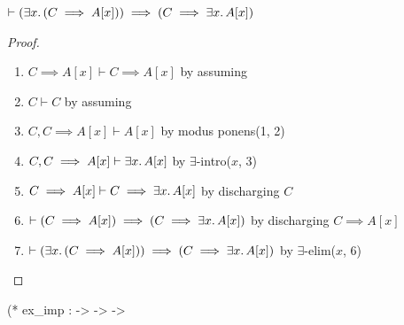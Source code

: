 \begin{node}
$\vdash(\exists x\ldotp(C\implies A[x]))\implies(C\implies\exists x\ldotp A[x])$
\end{node}

\begin{proof}
\begin{enumerate}
\item $C\implies A[x]\vdash C\implies A[x]$ by assuming
\item $C\vdash C$ by assuming
\item $C, C\implies A[x]\vdash A[x]$ by modus ponens(1, 2)%
\item $C, C\implies A[x]\vdash\exists x\ldotp A[x]$ by
  $\exists$-intro($x$, 3)%
\item $C\implies A[x]\vdash C\implies\exists x\ldotp A[x]$ by
  discharging $C$%
\item $\vdash(C\implies A[x])\implies(C\implies\exists x\ldotp A[x])$ by
  discharging $C\implies A[x]$%
\item $\vdash(\exists x\ldotp(C\implies A[x]))\implies(C\implies\exists x\ldotp A[x])$ by
  $\exists$-elim($x$, 6)\qedhere%
\end{enumerate}
\end{proof}

\nwenddocs{}\plusendmoddef\nwstartdeflinemarkup{}\nwenddeflinemarkup
(* ex_imp :  ->  ->  -> 

